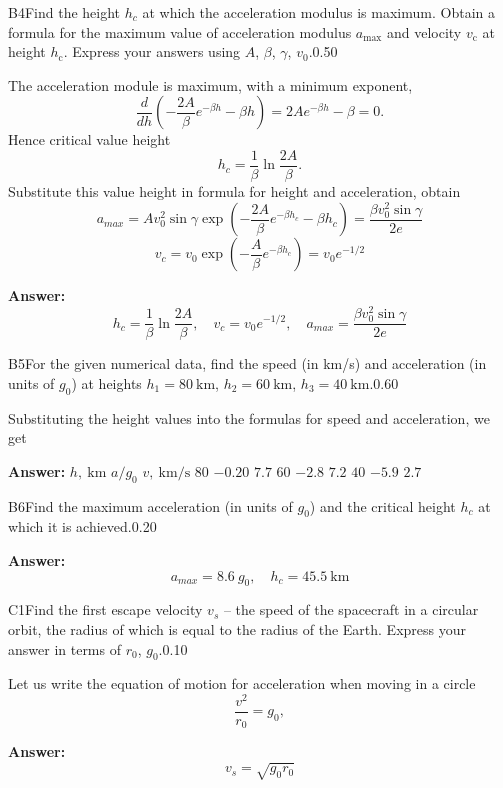 \documentclass[11pt,a4paper]{article}
\begin{document}
\begin{solcard}{B4}{Find the height $h_c$ at which the acceleration modulus is maximum. Obtain a formula for the maximum value of acceleration modulus $a_{\text{max}}$ and velocity $v_\text{c}$ at height $h_\text{c}$. Express your answers using $A$, $\beta$, $\gamma$, $v_0$.}{0.50}

The acceleration module is maximum, with a minimum exponent, $$\dfrac{d}{dh}\left(-\dfrac{2A}{\beta}e^{-\beta h}-\beta h\right)=2A e^{- \beta h} - \beta=0.$$Hence critical value height $$h_c=\dfrac{1}{\beta}\ln\dfrac{2A}{\beta}.$$Substitute this value height in formula for height and acceleration, obtain $$a_{max}=Av_0^2\sin{\gamma}\exp\left(-\dfrac{2A}{\beta}e^{-\beta h_c}-\beta h_c\right)=\dfrac{\beta v_0^2\sin{\gamma}}{2e}$$$$v_c=v_0\exp\left(-\dfrac{A}{\beta}e^{-\beta h_c}\right)=v_0e^{-1/2}$$

\par\smallskip\noindent\textbf{Answer:} $$h_c=\dfrac{1}{\beta}\ln\dfrac{2A}{\beta}, \quad v_c=v_0e^{-1/2}, \quad a_{max}=\dfrac{\beta v_0^2\sin{\gamma}}{2e}$$
\end{solcard}

\begin{solcard}{B5}{For the given numerical data, find the speed (in km/s) and acceleration (in units of $g_0$) at heights $h_1 = 80~\text{km}$, $h_2 = 60~\text{km}$, $h_3 = 40~\text{km}$.}{0.60}

Substituting the height values into the formulas for speed and acceleration, we get

\par\smallskip\noindent\textbf{Answer:} $h, ~\mathrm{km}$ $a/g_0$ $v, ~\mathrm{km}/\mathrm{s}$ $80$ $-0.20$ $7.7$ $60$ $-2.8$ $7.2$ $40$ $-5.9$ $2.7$
\end{solcard}

\begin{solcard}{B6}{Find the maximum acceleration (in units of $g_0$) and the critical height $h_c$ at which it is achieved.}{0.20}
\par\smallskip\noindent\textbf{Answer:} $$a_{max}=8.6~g_0, \quad h_c=45.5~\mathrm{km}$$
\end{solcard}

\begin{solcard}{C1}{Find the first escape velocity $v_s$ – the speed of the spacecraft in a circular orbit, the radius of which is equal to the radius of the Earth. Express your answer in terms of $r_0$, $g_0$.}{0.10}

Let us write the equation of motion for acceleration when moving in a circle $$ \frac{v^2}{r_0} = g_0, $$

\par\smallskip\noindent\textbf{Answer:} $$v_s=\sqrt{g_0r_0}$$
\end{solcard}
\end{document}
